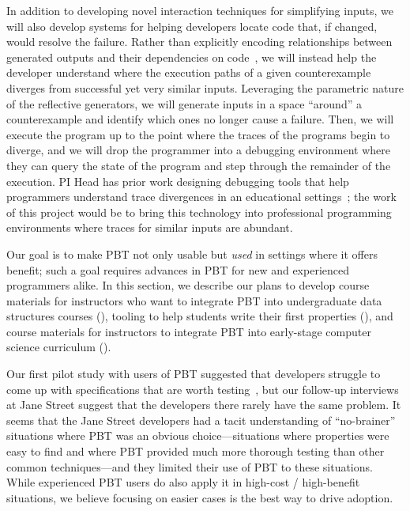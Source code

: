 In addition to developing novel interaction techniques for simplifying inputs,
we will also develop systems for helping developers locate code that, if
changed, would resolve the failure. Rather than explicitly encoding
relationships between generated outputs and their dependencies on
code~\cite{ref:ko2009finding}, we will instead help the developer
understand where the execution paths of a given counterexample diverges from
successful yet very similar inputs. Leveraging the parametric nature of the
reflective generators, we will generate inputs in a space ``around'' a
counterexample and identify which ones no longer cause a failure.  Then, we will
execute the program up to the point where the traces of the programs begin to
diverge, and we will drop the programmer into a debugging environment where
they can query the state of the program and step through the remainder of the
execution. PI Head has prior work designing debugging tools that help
programmers understand trace divergences in an educational
settings~\cite{ref:suzuki2017tracediff}; the work of this project would be to
bring this technology into professional programming environments where traces
for similar inputs are abundant.

%
Our goal is to make PBT not only usable but {\em
used} in settings where it offers benefit; such a goal requires advances in PBT
 for
new and experienced programmers alike. In this section, we describe
our plans to develop
course materials for instructors who want to integrate PBT into
undergraduate data structures courses (),
%
tooling to help students write their first properties
(),
%
and course materials for instructors to integrate PBT into
early-stage computer science curriculum ().


%
Our first pilot study with users of PBT suggested that developers struggle to
come up with specifications that are worth
testing~\cite{goldstein_problems_2022},
but
our follow-up interviews at Jane Street suggest that the developers there
rarely have the same problem. It seems that the Jane Street developers had
a tacit
understanding of ``no-brainer'' situations where PBT was an obvious
choice---situations where properties were easy to find and where PBT provided
much more thorough testing than other common techniques---and they limited their
use of PBT to these situations.
While experienced PBT users do also apply it in
high-cost / high-benefit situations, we believe
focusing on easier cases is the best way to drive adoption.

